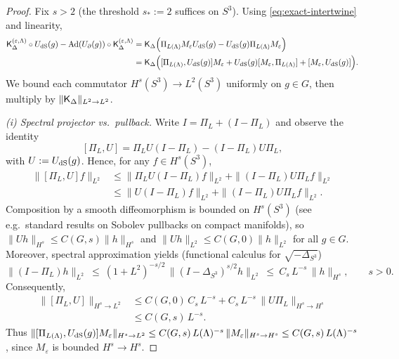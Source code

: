 \documentclass[10pt]{article}
\theoremstyle{definition}
\theoremstyle{plain}
\begin{document}
\begin{proof}
Fix $s>2$ (the threshold $s_*:=2$ suffices on $S^3$). Using \eqref{eq:exact-intertwine} and linearity,
\begin{equation}
\label{eq:3comm}
\begin{aligned}
{\sf K}_\Delta^{(\varepsilon,\Lambda)} \circ U_{\rm dS}(g) - \mathrm{Ad}(U_\partial(g))\circ {\sf K}_\Delta^{(\varepsilon,\Lambda)}
&= {\sf K}_\Delta \Big(\Pi_{L(\Lambda)}M_\varepsilon U_{\rm dS}(g) - U_{\rm dS}(g)\Pi_{L(\Lambda)}M_\varepsilon\Big)\\
&= {\sf K}_\Delta\Big([\Pi_{L(\Lambda)},U_{\rm dS}(g)] M_\varepsilon + U_{\rm dS}(g) [M_\varepsilon,\Pi_{L(\Lambda)}] + [M_\varepsilon,U_{\rm dS}(g)]\Big).
\end{aligned}
\end{equation}
We bound each commutator $H^s(S^3)\to L^2(S^3)$ uniformly on $g\in G$, then multiply by $\|{\sf K}_\Delta\|_{L^2\to L^2}$.

\smallskip
\emph{(i) Spectral projector vs.\ pullback.}
Write $I=\Pi_L+(I-\Pi_L)$ and observe the identity
\[
[\Pi_L,U]=\Pi_L U(I-\Pi_L) - (I-\Pi_L)U\Pi_L,
\]
with $U:=U_{\rm dS}(g)$. Hence, for any $f\in H^s(S^3)$,
\begin{align*}
\|[\Pi_L,U]f\|_{L^2}
&\le \|\Pi_L U(I-\Pi_L)f\|_{L^2} + \|(I-\Pi_L)U\Pi_L f\|_{L^2}\\
&\le \|U(I-\Pi_L)f\|_{L^2} + \|(I-\Pi_L)U\Pi_L f\|_{L^2}.
\end{align*}
Composition by a smooth diffeomorphism is bounded on $H^s(S^3)$ (see e.g.\ standard results on Sobolev pullbacks on compact manifolds), so
$\|U h\|_{H^s}\le C(G,s)\|h\|_{H^s}$ and $\|Uh\|_{L^2}\le C(G,0)\|h\|_{L^2}$ for all $g\in G$.
Moreover, spectral approximation yields (functional calculus for $\sqrt{-\Delta_{S^3}}$)
\begin{equation}\label{eq:spectral-approx}
\|(I-\Pi_L)h\|_{L^2}\ \le\ (1+L^2)^{-s/2}\,\|(I-\Delta_{S^3})^{s/2} h\|_{L^2}\ \le\ C_s\,L^{-s}\,\|h\|_{H^s},\qquad s>0.
\end{equation}
Consequently,
\begin{equation}
\label{eq:proj-U-bound}
\begin{aligned}
\|[\Pi_L,U]\|_{H^s\to L^2}
&\le C(G,0)\,C_s\,L^{-s} + C_s\,L^{-s}\,\|U\Pi_L\|_{H^s\to H^s}\\
&\le C(G,s)\,L^{-s}.
\end{aligned}
\end{equation}
Thus $\|[\Pi_{L(\Lambda)},U_{\rm dS}(g)]M_\varepsilon\|_{H^s\to L^2}\le C(G,s)\,L(\Lambda)^{-s}\,\|M_\varepsilon\|_{H^s\to H^s}\le C(G,s)\,L(\Lambda)^{-s}$, since $M_\varepsilon$ is bounded $H^s\to H^s$.


\end{proof}
\end{document}
